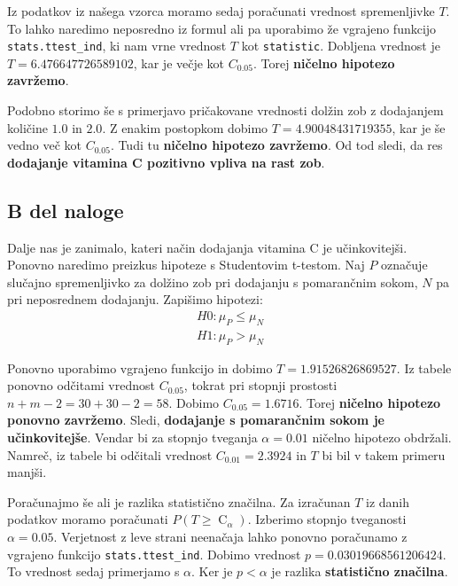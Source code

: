 \documentclass{article}
\DeclareMathOperator{\CM}{C}
\begin{document}
Iz podatkov iz našega vzorca moramo sedaj poračunati vrednost spremenljivke $T$. To lahko naredimo 
neposredno iz formul ali pa uporabimo že vgrajeno funkcijo \texttt{stats.ttest\_ind},
ki nam vrne vrednost $T$ kot \texttt{statistic}. Dobljena vrednost je $T=6.476647726589102$, 
kar je večje kot $C_{0.05}$. Torej \textbf{ničelno hipotezo zavržemo}.

Podobno storimo še s primerjavo pričakovane vrednosti dolžin zob z dodajanjem količine $1.0$ in $2.0$.
Z enakim postopkom dobimo $T = 4.90048431719355$, kar je še vedno več kot $C_{0.05}$. Tudi tu \textbf{ničelno hipotezo 
zavržemo}. Od tod sledi, da res \textbf{dodajanje vitamina C pozitivno vpliva na rast zob}.


\subsection{B del naloge}
Dalje nas je zanimalo, kateri način dodajanja vitamina C je učinkovitejši. Ponovno naredimo preizkus hipoteze s
Studentovim t-testom.
Naj $P$ označuje slučajno spremenljivko za dolžino zob pri dodajanju s pomarančnim sokom, $N$ pa pri neposrednem dodajanju.
Zapišimo hipotezi:
\begin{align}
    H0: \mu_P \le \mu_N \\
    H1: \mu_P > \mu_N
\end{align}

Ponovno uporabimo vgrajeno funkcijo in dobimo $T = 1.91526826869527$.
Iz tabele ponovno odčitami vrednost $C_{0.05}$, tokrat pri stopnji prostosti
$n + m - 2= 30 + 30 - 2 = 58$. Dobimo $C_{0.05} = 1.6716$. 
Torej \textbf{ničelno hipotezo ponovno zavržemo}. Sledi, \textbf{dodajanje s pomarančnim sokom je učinkovitejše}.
Vendar bi za stopnjo tveganja $\alpha=0.01$ ničelno hipotezo obdržali. Namreč, iz tabele bi 
odčitali vrednost $C_{0.01} = 2.3924$ in $T$ bi bil v takem primeru manjši.

Poračunajmo še ali je razlika statistično značilna. Za izračunan $T$ iz danih podatkov moramo 
poračunati $P(T \geq \CM_{\alpha})$. Izberimo stopnjo tveganosti $\alpha = 0.05$.
Verjetnost z leve strani neenačaja lahko ponovno poračunamo z vgrajeno funkcijo \texttt{stats.ttest\_ind}.
Dobimo vrednost $p=0.03019668561206424$. To vrednost sedaj primerjamo s $\alpha$. Ker je 
$p < \alpha$ je razlika \textbf{statistično značilna}.
\end{document}
